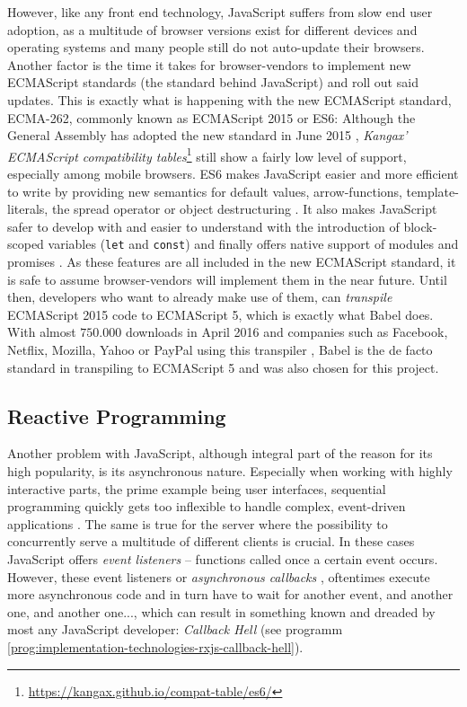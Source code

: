 However, like any front end technology, JavaScript suffers from slow end user adoption, as a multitude of browser versions exist for different devices and operating systems and many people still do not auto-update their browsers. Another factor is the time it takes for browser-vendors to implement new ECMAScript standards (the standard behind JavaScript) and roll out said updates. This is exactly what is happening with the new ECMAScript standard, ECMA-262, commonly known as ECMAScript 2015 or ES6: Although the General Assembly has adopted the new standard in June 2015 \cite{ecma2015}, \emph{Kangax' ECMAScript compatibility tables}\footnote{\url{https://kangax.github.io/compat-table/es6/}} still show a fairly low level of support, especially among mobile browsers. ES6 makes JavaScript easier and more efficient to write by providing new semantics for default values, arrow-functions, template-literals, the spread operator or object destructuring \cite{es6}. It also makes JavaScript safer to develop with and easier to understand with the introduction of block-scoped variables (\texttt{let} and \texttt{const}) and finally offers native support of modules and promises \cite{es6}.
As these features are all included in the new ECMAScript standard, it is safe to assume browser-vendors will implement them in the near future. Until then, developers who want to already make use of them, can \emph{transpile} ECMAScript 2015 code to ECMAScript 5, which is exactly what Babel does. With almost $750.000$ downloads in April 2016 \cite{npm-babel} and companies such as Facebook, Netflix, Mozilla, Yahoo or PayPal using this transpiler \cite{babel-users}, Babel is the de facto standard in transpiling to ECMAScript 5 and was also chosen for this project.

\subsection{Reactive Programming}
\label{sec:implementation-technologies-rxjs}

Another problem with JavaScript, although integral part of the reason for its high popularity, is its asynchronous nature. Especially when working with highly interactive parts, the prime example being user interfaces, sequential programming quickly gets too inflexible to handle complex, event-driven applications \cite{reactive-programming-survey}. The same is true for the server where the possibility to concurrently serve a multitude of different clients is crucial. In these cases JavaScript offers \emph{event listeners} -- functions called once a certain event occurs. However, these event listeners or \emph{asynchronous callbacks} \cite{reactive-programming-survey}, oftentimes execute more asynchronous code and in turn have to wait for another event, and another one, and another one..., which can result in something known and dreaded by most any JavaScript developer: \emph{Callback Hell} (see programm \ref{prog:implementation-technologies-rxjs-callback-hell}).

